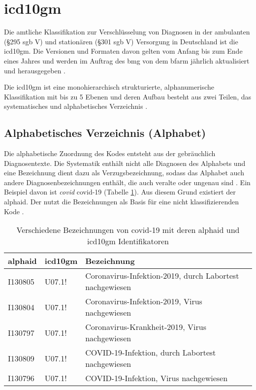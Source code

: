\section{\acs{icd10gm}}

Die amtliche Klassifikation zur Verschlüsselung von Diagnosen in der ambulanten (\S 295 \ac{sgb} V) und stationären (\S 301 \ac{sgb} V) Versorgung in Deutschland ist die \ac{icd10gm}. Die Versionen und Formaten davon gelten vom Anfang bis zum Ende eines Jahres und werden im Auftrag des \ac{bmg} von dem \ac{bfarm} jährlich aktualisiert und herausgegeben \cite{icd10}. 

Die \ac{icd10gm} ist eine monohierarchisch strukturierte, alphanumerische Klassifikation mit bis zu 5 Ebenen und deren Aufbau besteht aus zwei Teilen, das systematisches und alphabetisches Verzeichnis \cite{icd10}.

\subsection{Alphabetisches Verzeichnis (Alphabet)} \label{alphadir}

Die alphabetische Zuordnung des Kodes entsteht aus der gebräuchlich Diagnosentexte. Die Systematik enthält nicht alle Diagnosen des Alphabets und eine Bezeichnung dient dazu als Verzugsbezeichnung, sodass das Alphabet auch andere Diagnosenbezeichnungen enthält, die auch veralte oder ungenau sind \cite{icd10alpha}. Ein Beispiel davon ist \textit{\acl{covid}} \acs{covid}-19 (Tabelle \ref{tab:difbe}). Aus diesem Grund existiert der \ac{alphaid}. Der nutzt die Bezeichnungen als Basis für eine nicht klassifizierenden Kode \cite{icd10alpha}.

\begin{table}[ht]
	\centering
	\small
	\caption[Verschiedene Bezeichnungen von COVID-19]{Verschiedene Bezeichnungen von \ac{covid}-19 mit deren \ac{alphaid} und \ac{icd10gm} Identifikatoren}
	\label{tab:difbe}
	\begin{tabular}{|l|l|l|}
		\hline
		\rowcolor{lightgray} \ac{alphaid} & \ac{icd10gm} & Bezeichnung \\
		\hline
		I130805 & U07.1! & Coronavirus-Infektion-2019, durch Labortest nachgewiesen \\ \hline
		I130804 & U07.1! & Coronavirus-Infektion-2019, Virus nachgewiesen \\ \hline
		I130797 & U07.1! & Coronavirus-Krankheit-2019, Virus nachgewiesen \\ \hline
		I130809 & U07.1! & COVID-19-Infektion, durch Labortest nachgewiesen \\ \hline
		I130796 & U07.1! & COVID-19-Infektion, Virus nachgewiesen \\ \hline				
	\end{tabular}
\end{table}

